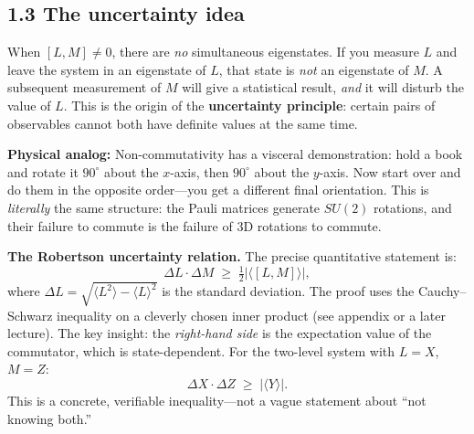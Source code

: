 \documentclass[12pt,a4paper]{article}
\begin{document}
\subsection{1.3 The uncertainty idea}
When $[L,M]\neq 0$, there are \emph{no} simultaneous eigenstates.  If you measure $L$ and leave the system in an eigenstate of $L$, that state is \emph{not} an eigenstate of $M$.  A subsequent measurement of $M$ will give a statistical result, \emph{and} it will disturb the value of $L$.  This is the origin of the \textbf{uncertainty principle}: certain pairs of observables cannot both have definite values at the same time.

\medskip
\noindent\textbf{Physical analog:} Non-commutativity has a visceral demonstration: hold a book and rotate it $90^\circ$ about the $x$-axis, then $90^\circ$ about the $y$-axis.  Now start over and do them in the opposite order---you get a different final orientation.  This is \emph{literally} the same structure: the Pauli matrices generate $SU(2)$ rotations, and their failure to commute is the failure of 3D rotations to commute.

\medskip
\noindent\textbf{The Robertson uncertainty relation.}  The precise quantitative statement is:
\[
    \boxed{\Delta L\cdot\Delta M \;\geq\; \tfrac{1}{2}\bigl|\langle [L,M]\rangle\bigr|,}
\]
where $\Delta L = \sqrt{\langle L^2\rangle - \langle L\rangle^2}$ is the standard deviation.  The proof uses the Cauchy--Schwarz inequality on a cleverly chosen inner product (see appendix or a later lecture).  The key insight: the \emph{right-hand side} is the expectation value of the commutator, which is state-dependent.  For the two-level system with $L=X$, $M=Z$:
\[
    \Delta X\cdot\Delta Z \;\geq\; \bigl|\langle Y\rangle\bigr|.
\]
This is a concrete, verifiable inequality---not a vague statement about ``not knowing both.''
\end{document}
